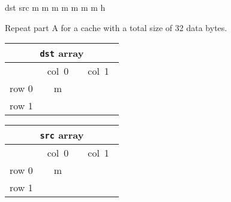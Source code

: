 \begin{problem}{12}
\begin{choice}
{dst		src
m m		m m
m m		m h
}
\vspace{.2in}
\item Repeat part A for a cache with a total size of 32 data bytes.

\begin{minipage}[t]{2in}
\renewcommand{\arraystretch}{1.8}
\begin{tabular}{|c||c|c|}
\hline
\multicolumn{3}{|c|}{{\tt dst} array}\\
\hline
&\mbox{\ col 0\ }&\mbox{\ col 1\ }\\
\hline
\hline
row 0&m&\\
\hline
row 1&&\\
\hline
\end{tabular}
\end{minipage}
\begin{minipage}[t]{2in}
\renewcommand{\arraystretch}{1.8}
\begin{tabular}{|c||c|c|}
\hline
\multicolumn{3}{|c|}{{\tt src} array}\\
\hline
&\mbox{\ col 0\ }&\mbox{\ col 1\ }\\
\hline
\hline
row 0&m&\\
\hline
row 1&&\\
\hline
\end{tabular}
\end{minipage}
\end{choice}
\end{problem}